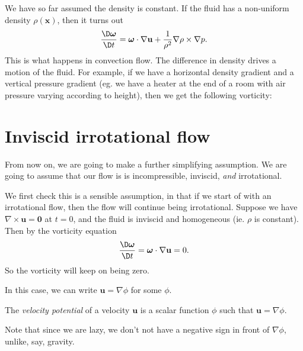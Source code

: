 \documentclass[a4paper]{article}
\begin{document}
We have so far assumed the density is constant. If the fluid has a non-uniform density $\rho(\mathbf{x})$, then it turns out
\[
  \frac{\D \boldsymbol\omega}{\D t} = \boldsymbol\omega \cdot \nabla \mathbf{u} + \frac{1}{\rho^2} \nabla \rho \times \nabla p.
\]
This is what happens in convection flow. The difference in density drives a motion of the fluid. For example, if we have a horizontal density gradient and a vertical pressure gradient (eg. we have a heater at the end of a room with air pressure varying according to height), then we get the following vorticity:
\begin{center}
\end{center}

\section{Inviscid irrotational flow}
From now on, we are going to make a further simplifying assumption. We are going to assume that our flow is is incompressible, inviscid, \emph{and} irrotational.

We first check this is a sensible assumption, in that if we start of with an irrotational flow, then the flow will continue being irrotational. Suppose we have $\nabla \times \mathbf{u} = \mathbf{0}$ at $t = 0$, and the fluid is inviscid and homogeneous (ie. $\rho$ is constant). Then by the vorticity equation
\[
  \frac{\D \boldsymbol\omega}{\D t} = \boldsymbol\omega \cdot \nabla \mathbf{u} = 0.
\]
So the vorticity will keep on being zero.

In this case, we can write $\mathbf{u} = \nabla \phi$ for some $\phi$.
\begin{defi}
  The \emph{velocity potential} of a velocity $\mathbf{u}$ is a scalar function $\phi$ such that $\mathbf{u} = \nabla \phi$.
\end{defi}
Note that since we are lazy, we don't not have a negative sign in front of $\nabla \phi$, unlike, say, gravity.
\end{document}
